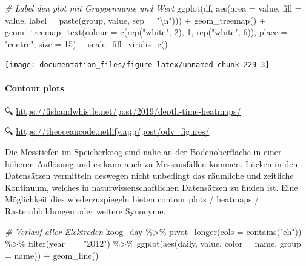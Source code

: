\documentclass[
]{article}
\newenvironment{Shaded}{\begin{snugshade}}{\end{snugshade}}
\newcommand{\AttributeTok}[1]{\textcolor[rgb]{0.77,0.63,0.00}{#1}}
\newcommand{\CommentTok}[1]{\textcolor[rgb]{0.56,0.35,0.01}{\textit{#1}}}
\newcommand{\DecValTok}[1]{\textcolor[rgb]{0.00,0.00,0.81}{#1}}
\newcommand{\FunctionTok}[1]{\textcolor[rgb]{0.00,0.00,0.00}{#1}}
\newcommand{\NormalTok}[1]{#1}
\newcommand{\SpecialCharTok}[1]{\textcolor[rgb]{0.00,0.00,0.00}{#1}}
\newcommand{\StringTok}[1]{\textcolor[rgb]{0.31,0.60,0.02}{#1}}
\begin{document}
\begin{Shaded}
\begin{Highlighting}[]
 
\CommentTok{\# Label den plot mit Gruppenname und Wert}
\FunctionTok{ggplot}\NormalTok{(df, }\FunctionTok{aes}\NormalTok{(}\AttributeTok{area =}\NormalTok{ value, }\AttributeTok{fill =}\NormalTok{ value, }\AttributeTok{label =} \FunctionTok{paste}\NormalTok{(group, value, }\AttributeTok{sep =} \StringTok{"}\SpecialCharTok{\textbackslash{}n}\StringTok{"}\NormalTok{))) }\SpecialCharTok{+}
  \FunctionTok{geom\_treemap}\NormalTok{() }\SpecialCharTok{+}
  \FunctionTok{geom\_treemap\_text}\NormalTok{(}\AttributeTok{colour =} \FunctionTok{c}\NormalTok{(}\FunctionTok{rep}\NormalTok{(}\StringTok{"white"}\NormalTok{, }\DecValTok{2}\NormalTok{),}
                               \DecValTok{1}\NormalTok{, }\FunctionTok{rep}\NormalTok{(}\StringTok{"white"}\NormalTok{, }\DecValTok{6}\NormalTok{)),}
                    \AttributeTok{place =} \StringTok{"centre"}\NormalTok{, }\AttributeTok{size =} \DecValTok{15}\NormalTok{) }\SpecialCharTok{+}
  \FunctionTok{scale\_fill\_viridis\_c}\NormalTok{()}
\end{Highlighting}
\end{Shaded}

\begin{center}\texttt{[image: documentation\_files/figure-latex/unnamed-chunk-229-3]} \end{center}

\hypertarget{contour-plots}{%
\paragraph{Contour plots}\label{contour-plots}}

🔍 \url{https://fishandwhistle.net/post/2019/depth-time-heatmaps/}

🔍 \url{https://theoceancode.netlify.app/post/odv_figures/}

Die Messtiefen im Speicherkoog sind nahe an der Bodenoberfläche in einer höheren Auflösung und es kann auch zu Messausfällen kommen. Lücken in den Datensätzen vermitteln deswegen nicht unbedingt das räumliche und zeitliche Kontinuum, welches in naturwissenschaftlichen Datensätzen zu finden ist. Eine Möglichkeit dies wiederzuspiegeln bieten contour plots / heatmaps / Rasterabbildungen oder weitere Synonyme.

\begin{Shaded}
\begin{Highlighting}[]

\CommentTok{\# Verlauf aller Elektroden}
\NormalTok{koog\_day }\SpecialCharTok{\%\textgreater{}\%}
  \FunctionTok{pivot\_longer}\NormalTok{(}\AttributeTok{cols =} \FunctionTok{contains}\NormalTok{(}\StringTok{"eh"}\NormalTok{)) }\SpecialCharTok{\%\textgreater{}\%}
  \FunctionTok{filter}\NormalTok{(year }\SpecialCharTok{==} \StringTok{"2012"}\NormalTok{) }\SpecialCharTok{\%\textgreater{}\%}
  \FunctionTok{ggplot}\NormalTok{(}\FunctionTok{aes}\NormalTok{(daily, value, }\AttributeTok{color =}\NormalTok{ name, }\AttributeTok{group =}\NormalTok{ name)) }\SpecialCharTok{+}
  \FunctionTok{geom\_line}\NormalTok{()}
\end{Highlighting}
\end{Shaded}
\end{document}

